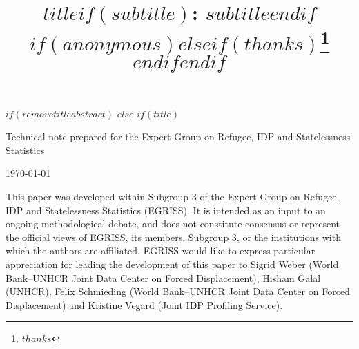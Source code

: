 \documentclass[$if(fontsize)$$fontsize$,$endif$$if(lang)$$babel-lang$,$endif$$if(papersize)$$papersize$,$endif$$for(classoption)$$classoption$$sep$,$endfor$]{article}
\title{$title$$if(subtitle)$: $subtitle$$endif$ $if(anonymous)$$else$$if(thanks)$\thanks{$thanks$} $endif$$endif$ }
\date{}
\begin{document}
 

$if(removetitleabstract)$
$else$
$if(title)$

{
\thispagestyle{empty}

\begin{center}

\vspace*{1.5cm}

\vspace*{1.5cm}

 Technical note prepared for the Expert Group on Refugee, IDP and Statelessness Statistics

\bigskip
\today

\end{center}

\vfill


\noindent This paper was developed within Subgroup 3 of the Expert Group on Refugee, IDP and Statelessness Statistics (EGRISS). It is intended as an input to an ongoing methodological debate, and does not constitute consensus or represent the official views of EGRISS, its members, Subgroup 3, or the institutions with which the authors are affiliated. EGRISS would like to express particular appreciation for leading the development of this paper to Sigrid Weber (World Bank–UNHCR Joint Data Center on Forced Displacement), Hisham Galal (UNHCR), Felix Schmieding (World Bank–UNHCR Joint Data Center on Forced Displacement) and Kristine Vegard (Joint IDP Profiling Service).


}
\end{document}
